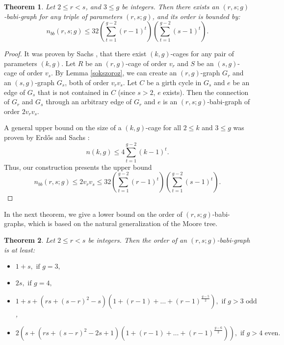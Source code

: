 \documentclass[a4paper,11pt]{article}
\newtheorem{theorem}{Theorem}[section]
\begin{document}
\begin{theorem}
\label{2ossze}
Let $2\leq r<s$, and $ 3\leq g$ be integers.  
Then there exists an $(r,s;g)$-babi-graph for any triple of parameters $(r,s;g)$, and its order is bounded by: 
$$n_{bb}(r,s;g)\leq 32\left( \sum_{t=1}^{g-2}(r-1)^t\right) \left( \sum_{t=1}^{g-2}(s-1)^t\right) .$$
\end{theorem}

\begin{proof}
It was proven by Sachs \cite{101}, that there exist $(k,g)$-cages for any pair of parameters $(k,g)$.
Let $R$ be an $(r,g)$-cage of order $v_r$ and $S$ be an $(s,g)$-cage of order $v_s$. 
By Lemma \ref{sokszoroz}, we can create an $(r,g)$-graph $G_r$ and an $(s,g)$-graph $G_s$, both of order
$v_rv_s$. Let $C$ be a girth cycle in $G_s$ and $e$ be an edge of $G_s$ that is not contained in $C$
(since $s>2$, $e$ exists). Then the connection of $G_r$ and $G_s$ through an arbitrary edge of $G_r$ and $e$ is an $(r,s;g)$-babi-graph of order $2v_rv_s$.

A general upper bound on the size of a $(k,g)$-cage for all $2\leq k$ and 
$3\leq g$ was proven by Erd\H os and Sachs \cite{44}:
$$n(k,g)\leq 4\sum_{t=1}^{g-2}(k-1)^t.$$
Thus, our construction presents the upper bound 
$$n_{bb}(r,s;g)\leq 2v_rv_s\leq 
32\left( \sum_{t=1}^{g-2}(r-1)^t\right) \left( \sum_{t=1}^{g-2}(s-1)^t\right) .$$
\end{proof}



In the next theorem, we give a lower bound on the order of $(r,s;g)$-babi-graphs, which is based on the natural generalization of the Moore tree. 

\begin{theorem}\label{lowerboundbabigraph}
Let $2\leq r<s$ be integers.
Then the order of an $(r,s;g)$-babi-graph is at least:
\begin{itemize}
\item
$1+s, \text{ if } g =3,$
\item
$2s, \text{ if } g =4,$
\item
$1+s + 
(rs+(s-r)^2-s)(1+(r-1)+\ldots + (r-1)^{\frac{g-5}{2}}),
\text{ if } g>3 \text{ odd}$,  
\item
$2\left( s+
(rs+(s-r)^2-2s+1)(1+(r-1)+\ldots + (r-1)^{\frac{g-6}{2}})\right)  ,
\text{ if } g>4 \text{ even.}$
\end{itemize}

\end{theorem}
\end{document}
